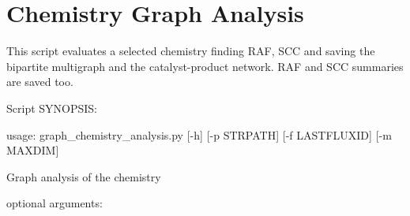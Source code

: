\documentclass[letterpaper,10pt,english]{sphinxmanual}
\begin{document}
\section{Chemistry Graph Analysis}
\label{graph_chemistry_analysis:chemistry-graph-analysis}\label{graph_chemistry_analysis:module-graph_chemistry_analysis}\label{graph_chemistry_analysis::doc}
This script evaluates a selected chemistry finding RAF, SCC and 
saving the bipartite multigraph and the catalyst-product network. 
RAF and SCC summaries are saved too.

Script SYNOPSIS:

usage: graph\_chemistry\_analysis.py {[}-h{]} {[}-p STRPATH{]} {[}-f LASTFLUXID{]} {[}-m MAXDIM{]}

Graph analysis of the chemistry
\begin{description}
\item[{optional arguments:}] \leavevmode{}

\end{description}
\end{document}
